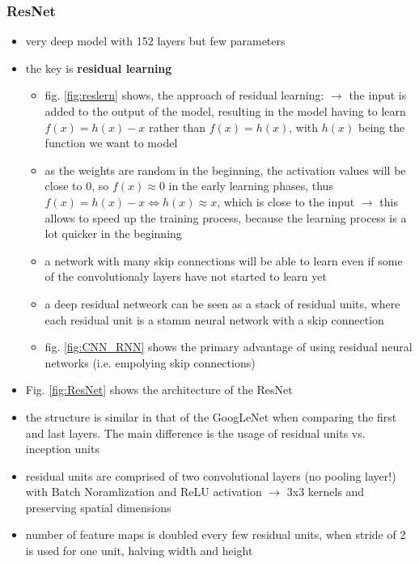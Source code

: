 \documentclass[12pt,a4paper]{article}
\begin{document}
\subsubsection{ResNet} %
\label{ssub:resnet}
\begin{itemize}
  \item very deep model with 152 layers but few parameters
  \item the key is \textbf{residual learning}
  \begin{itemize}
    \item fig. \ref{fig:reslern} shows, the approach of residual learning:
    \newline \indent $\longrightarrow$ the input is added to the output of the model, resulting in the model having to learn $f(x) = h(x) - x$ rather than $f(x) = h(x)$, with $h(x)$ being the function we want to model
    \item as the weights are random in the beginning, the activation values will be close to 0, so $f(x) \approx 0$ in the early learning phases, thus $f(x) = h(x) - x \iff h(x) \approx x$, which is close to the input
    \newline \indent $\longrightarrow$ this allows to speed up the training process, because the learning process is a lot quicker in the beginning
    \item a network with many skip connections will be able to learn even if some of the convolutionaly layers have not started to learn yet
    \item a deep residual netweork can be seen as a stack of residual units, where each residual unit is a stamm neural network with a skip connection
    \item fig. \ref{fig:CNN_RNN} shows the primary advantage of using residual neural networks (i.e. empolying skip connections)
  \end{itemize}
  \item Fig. \ref{fig:ResNet} shows the architecture of the ResNet
  \item the structure is similar in that of the GoogLeNet when comparing the first and last layers. The main difference is the usage of residual units vs. inception units
  \item residual units are comprised of two convolutional layers (no pooling layer!) with Batch Noramlization and ReLU activation
  \newline \indent $\longrightarrow$ 3x3 kernels and preserving spatial dimensions
  \item number of feature maps is doubled every few residual units, when stride of 2 is used for one unit, halving width and height

\end{itemize}
\end{document}
